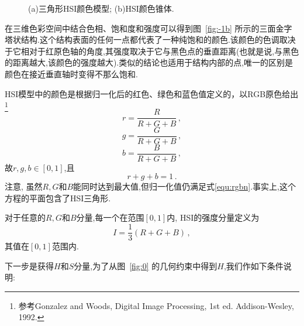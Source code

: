 \begin{figure}[htbp]
{
  }
  \caption{(a)三角形HSI颜色模型; (b)HSI颜色锥体.}
  \label{fig:-1}
\end{figure}

在三维色彩空间中结合色相、饱和度和强度可以得到图~\ref{fig:-1b} 所示的三面金字塔状结构.这个结构表面的任何一点都代表了一种纯饱和的颜色.该颜色的色调取决于它相对于红原色轴的角度,其强度取决于它与黑色点的垂直距离(也就是说,与黑色的距离越大,该颜色的强度越大).类似的结论也适用于结构内部的点,唯一的区别是颜色在接近垂直轴时变得不那么饱和.

HSI模型中的颜色是根据归一化后的红色、绿色和蓝色值定义的，以RGB原色给出\footnote{参考Gonzalez and Woods, Digital Image Processing, 1st ed. Addison-Wesley, 1992.}
\begin{equation}\label{equ:1}
  r=\frac{R}{R+G+B}\,,
\end{equation}
\begin{equation}\label{equ:2}
  g=\frac{G}{R+G+B}\,,
\end{equation}
\begin{equation}\label{equ:3}
  b=\frac{B}{R+G+B}\,,
\end{equation}
故$r,g,b\in [0,1]$,且
\begin{equation}\label{equ:rgbn}
  r+g+b=1\,.
\end{equation}
注意, 虽然$R,G$和$B$能同时达到最大值,但归一化值仍满足式\eqref{equ:rgbn}.事实上,这个方程的平面包含了HSI三角形.

对于任意的$R,G$和$B$分量,每一个在范围$[0,1]$内, HSI的强度分量定义为
\begin{equation}\label{equ:I}
  I=\frac{1}{3}(R+G+B)\,,
\end{equation}
其值在$[0,1]$范围内.

下一步是获得$H$和$S$分量,为了从图~\ref{fig:0} 的几何约束中得到$H$,我们作如下条件说明:

